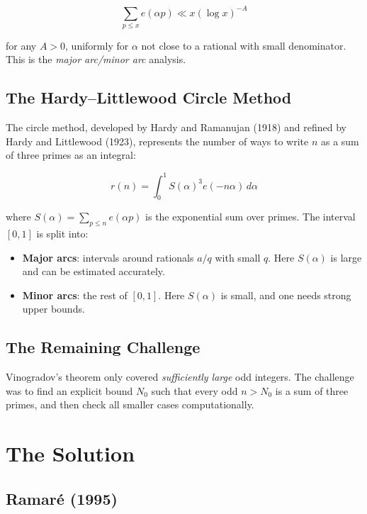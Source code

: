 \begin{equation}
\sum_{p \leq x} e(\alpha p) \ll x(\log x)^{-A}
\end{equation}

for any $A > 0$, uniformly for $\alpha$ not close to a rational with small denominator. This is the \emph{major arc/minor arc} analysis.

\subsection{The Hardy--Littlewood Circle Method}

The circle method, developed by Hardy and Ramanujan (1918) and refined by Hardy and Littlewood (1923), represents the number of ways to write $n$ as a sum of three primes as an integral:

\begin{equation}
r(n) = \int_0^1 S(\alpha)^3 e(-n\alpha) \, d\alpha
\end{equation}

where $S(\alpha) = \sum_{p \leq n} e(\alpha p)$ is the exponential sum over primes. The interval $[0,1]$ is split into:
\begin{itemize}
\item \textbf{Major arcs}: intervals around rationals $a/q$ with small $q$. Here $S(\alpha)$ is large and can be estimated accurately.
\item \textbf{Minor arcs}: the rest of $[0,1]$. Here $S(\alpha)$ is small, and one needs strong upper bounds.
\end{itemize}

\subsection{The Remaining Challenge}

Vinogradov's theorem only covered \emph{sufficiently large} odd integers. The challenge was to find an explicit bound $N_0$ such that every odd $n > N_0$ is a sum of three primes, and then check all smaller cases computationally.

\section{The Solution}

\subsection{Ramaré (1995)}


